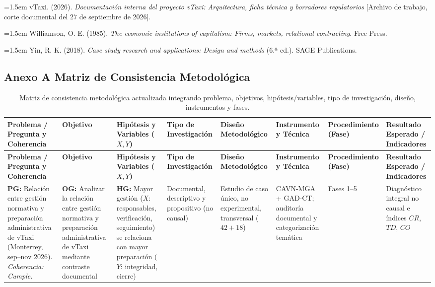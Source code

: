 {\hangindent=1.5em vTaxi. (2026). \textit{Documentación interna del proyecto vTaxi: Arquitectura, ficha técnica y borradores regulatorios} [Archivo de trabajo, corte documental del 27 de septiembre de 2026].

\hangindent=1.5em Williamson, O. E. (1985). \textit{The economic institutions of capitalism: Firms, markets, relational contracting}. Free Press.

\hangindent=1.5em Yin, R. K. (2018). \textit{Case study research and applications: Design and methods} (6.ª ed.). SAGE Publications.
\endgroup

\begin{aulatexlandscape}
\section*{Anexo A Matriz de Consistencia Metodológica}
\begingroup\fontsize{7.1}{8.8}\selectfont
\setlength{\tabcolsep}{2.5pt}
\begin{longtable}{@{}p{2.9cm}p{2.9cm}p{2.5cm}p{2.2cm}p{2.2cm}p{2.1cm}p{1.6cm}p{2.5cm}@{}}
\caption{Matriz de consistencia metodológica actualizada integrando problema, objetivos, hipótesis/variables, tipo de investigación, diseño, instrumentos y fases.}\\
\toprule
\textbf{Problema / Pregunta y Coherencia} & \textbf{Objetivo} & \textbf{Hipótesis y Variables ($X, Y$)} & \textbf{Tipo de Investigación} & \textbf{Diseño Metodológico} & \textbf{Instrumento y Técnica} & \textbf{Procedimiento (Fase)} & \textbf{Resultado Esperado / Indicadores} \\
\midrule
\endfirsthead
\toprule
\textbf{Problema / Pregunta y Coherencia} & \textbf{Objetivo} & \textbf{Hipótesis y Variables ($X, Y$)} & \textbf{Tipo de Investigación} & \textbf{Diseño Metodológico} & \textbf{Instrumento y Técnica} & \textbf{Procedimiento (Fase)} & \textbf{Resultado Esperado / Indicadores} \\
\midrule
\endhead
\textbf{PG:} Relación entre gestión normativa y preparación administrativa de vTaxi (Monterrey, sep--nov 2026). \textit{Coherencia: Cumple.} & \textbf{OG:} Analizar la relación entre gestión normativa y preparación administrativa de vTaxi mediante contraste documental & \textbf{HG:} Mayor gestión ($X$: responsables, verificación, seguimiento) se relaciona con mayor preparación ($Y$: integridad, cierre) & Documental, descriptivo y propositivo (no causal) & Estudio de caso único, no experimental, transversal ($42+18$) & CAVN-MGA + GAD-CT; auditoría documental y categorización temática & Fases 1--5 & Diagnóstico integral no causal e índices $CR$, $TD$, $CO$ \\

\end{longtable}
\end{aulatexlandscape}}

